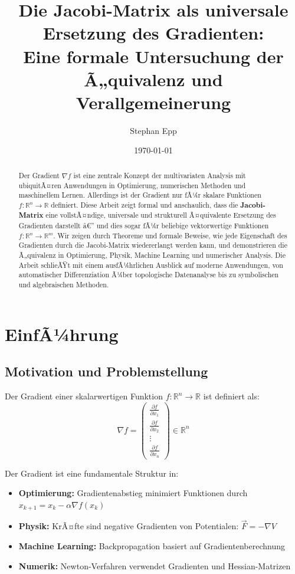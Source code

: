 ﻿\documentclass[a4paper,12pt]{article}
\title{Die Jacobi-Matrix als universale Ersetzung des Gradienten:\\ Eine formale Untersuchung der Ã„quivalenz und Verallgemeinerung}
\author{Stephan Epp}
\date{\today}
\theoremstyle{definition}
\begin{document}
\maketitle

\begin{abstract}
Der Gradient $\nabla f$ ist eine zentrale Konzept der multivariaten Analysis mit ubiquitÃ¤ren Anwendungen in Optimierung, numerischen Methoden und maschinellem Lernen. Allerdings ist der Gradient nur fÃ¼r skalare Funktionen $f: \mathbb{R}^n \to \mathbb{R}$ definiert. Diese Arbeit zeigt formal und anschaulich, dass die \textbf{Jacobi-Matrix} eine vollstÃ¤ndige, universale und strukturell Ã¤quivalente Ersetzung des Gradienten darstellt â€” und dies sogar fÃ¼r beliebige vektorwertige Funktionen $f: \mathbb{R}^n \to \mathbb{R}^m$. Wir zeigen durch Theoreme und formale Beweise, wie jede Eigenschaft des Gradienten durch die Jacobi-Matrix wiedererlangt werden kann, und demonstrieren die Ã„quivalenz in Optimierung, Physik, Machine Learning und numerischer Analysis. Die Arbeit schlieÃŸt mit einem ausfÃ¼hrlichen Ausblick auf moderne Anwendungen, von automatischer Differenziation Ã¼ber topologische Datenanalyse bis zu symbolischen und algebraischen Methoden.
\end{abstract}

\tableofcontents
\newpage

\section{EinfÃ¼hrung}

\subsection{Motivation und Problemstellung}

Der Gradient einer skalarwertigen Funktion $f: \mathbb{R}^n \to \mathbb{R}$ ist definiert als:
\[
\nabla f = \begin{pmatrix} \frac{\partial f}{\partial x_1} \\ \frac{\partial f}{\partial x_2} \\ \vdots \\ \frac{\partial f}{\partial x_n} \end{pmatrix} \in \mathbb{R}^n
\]

Der Gradient ist eine fundamentale Struktur in:
\begin{itemize}
	\item \textbf{Optimierung:} Gradientenabstieg minimiert Funktionen durch $x_{k+1} = x_k - \alpha \nabla f(x_k)$
	\item \textbf{Physik:} KrÃ¤fte sind negative Gradienten von Potentialen: $\vec{F} = -\nabla V$
	\item \textbf{Machine Learning:} Backpropagation basiert auf Gradientenberechnung
	\item \textbf{Numerik:} Newton-Verfahren verwendet Gradienten und Hessian-Matrizen
\end{itemize}
\end{document}
